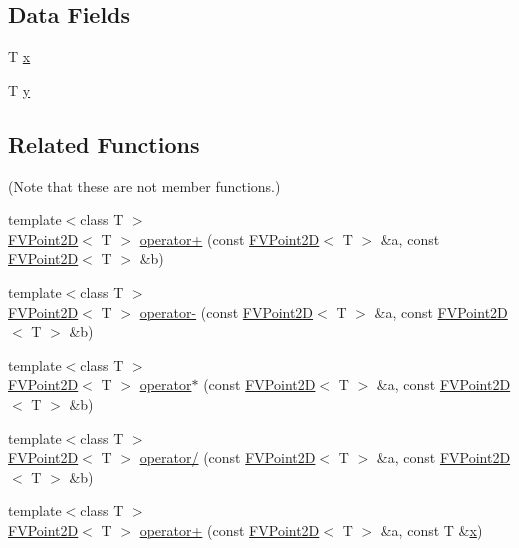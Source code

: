 \subsection*{Data Fields}
\begin{DoxyCompactItemize}
\item 
T \hyperlink{classFVL_1_1FVPoint2D_a9a4f74af87a76a4c3dcb729cb0e68f8d}{x}
\item 
T \hyperlink{classFVL_1_1FVPoint2D_a1cb2b5ea04251d543e49356ef54eb853}{y}
\end{DoxyCompactItemize}
\subsection*{Related Functions}
(Note that these are not member functions.) \begin{DoxyCompactItemize}
\item 
{\footnotesize template$<$class T $>$ }\\\hyperlink{classFVL_1_1FVPoint2D}{FVPoint2D}$<$ T $>$ \hyperlink{classFVL_1_1FVPoint2D_af8f481fb9e7a476e2f5148f01f36a05a}{operator+} (const \hyperlink{classFVL_1_1FVPoint2D}{FVPoint2D}$<$ T $>$ \&a, const \hyperlink{classFVL_1_1FVPoint2D}{FVPoint2D}$<$ T $>$ \&b)
\item 
{\footnotesize template$<$class T $>$ }\\\hyperlink{classFVL_1_1FVPoint2D}{FVPoint2D}$<$ T $>$ \hyperlink{classFVL_1_1FVPoint2D_a5f264c9cef903053a216a56c65d9249e}{operator-\/} (const \hyperlink{classFVL_1_1FVPoint2D}{FVPoint2D}$<$ T $>$ \&a, const \hyperlink{classFVL_1_1FVPoint2D}{FVPoint2D}$<$ T $>$ \&b)
\item 
{\footnotesize template$<$class T $>$ }\\\hyperlink{classFVL_1_1FVPoint2D}{FVPoint2D}$<$ T $>$ \hyperlink{classFVL_1_1FVPoint2D_a04bc7e803d73ef330131856d6105c730}{operator$\ast$} (const \hyperlink{classFVL_1_1FVPoint2D}{FVPoint2D}$<$ T $>$ \&a, const \hyperlink{classFVL_1_1FVPoint2D}{FVPoint2D}$<$ T $>$ \&b)
\item 
{\footnotesize template$<$class T $>$ }\\\hyperlink{classFVL_1_1FVPoint2D}{FVPoint2D}$<$ T $>$ \hyperlink{classFVL_1_1FVPoint2D_a7cf0bdae41a03ea052321be2e9d71692}{operator/} (const \hyperlink{classFVL_1_1FVPoint2D}{FVPoint2D}$<$ T $>$ \&a, const \hyperlink{classFVL_1_1FVPoint2D}{FVPoint2D}$<$ T $>$ \&b)
\item 
{\footnotesize template$<$class T $>$ }\\\hyperlink{classFVL_1_1FVPoint2D}{FVPoint2D}$<$ T $>$ \hyperlink{classFVL_1_1FVPoint2D_a93156f566b5920e9bc7989d0600a5012}{operator+} (const \hyperlink{classFVL_1_1FVPoint2D}{FVPoint2D}$<$ T $>$ \&a, const T \&\hyperlink{classFVL_1_1FVPoint2D_a9a4f74af87a76a4c3dcb729cb0e68f8d}{x})

\end{DoxyCompactItemize}
